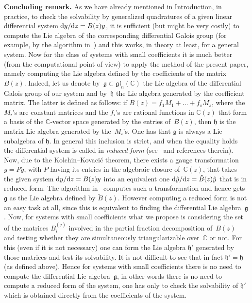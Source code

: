 \documentclass[pdftex]{sigma}
\numberwithin{equation}{section}
\begin{document}
{\bf Concluding remark.} As we have already mentioned in Introduction, in practice, to check the solvability by generalized quadratures of a given linear differential system ${\rm d}y/{\rm d}z =B(z)y$, it is sufficient (but might be very costly) to compute the Lie algebra of the corresponding differential Galois group (for example, by the algorithm in~\cite{BCDW16}) and this works, in theory at least, for a general system. Now for the class of systems with small coefficients it is much better (from the computational point of view) to apply the method of the present paper, namely computing the Lie algebra defined by the coefficients of the matrix~$B(z)$. Indeed, let us denote by~$\mathfrak{g} \subset {\mathfrak{gl}}_n({\mathbb C})$ the Lie algebra of the differential Galois group of our system and by~$\mathfrak{h}$ the Lie algebra generated by the coefficient matrix. The latter is defined as follows: if $B(z) = f_1M_1 + \dots+ f_sM_s$, where the~$M_i$'s are constant matrices and the $f_i$'s are rational functions in ${\mathbb C}(z)$ that form a basis of the $\mathbb C$-vector space generated by the entries of~$B(z)$, then $\mathfrak{h}$ is the matrix Lie algebra generated by the~$M_i$'s. One has that $\mathfrak{g}$ is always a Lie subalgebra of $\mathfrak{h}$. In general this inclusion is strict, and when the equality holds the differential system is called in {\em reduced form} (see~\cite{BCDW16} and references therein). Now, due to the Kolchin--Kovaci\'c theorem, there exists a gauge transformation $y = P \tilde{y}$, with $P$ having its entries in the algebraic closure of~${\mathbb C}(z)$, that takes the given system ${\rm d}y/{\rm d}z = B(z) y$ into an equivalent one ${\rm d}\tilde{y}/{\rm d}z=\tilde{B}(z) \tilde{y}$ that is in reduced form. The algorithm in~\cite{BCDW16} computes such a transformation and hence gets $\mathfrak{g}$ as the Lie algebra defined by $\tilde{B}(z)$. However computing a reduced form is not an easy task at all, since this is equivalent to finding the differential Lie algebra~$\mathfrak{g}$. Now, for systems with small coefficients what we propose is considering the set of the matrices $B_i^{(j)}$ involved in the partial fraction decomposition of~$B(z)$ and testing whether they are
simultaneously triangularizable over~$\mathbb C$ or not. For this (even if it is not necessary) one can form the Lie algebra $\mathfrak{h}'$ generated by those matrices and test its solvability. It is not difficult to see that in fact $\mathfrak{h}' = \mathfrak{h}$ (as defined above). Hence for systems with small coefficients there is no need to compute the differential Lie algebra~$\mathfrak{g}$, in other words there is no need to compute a reduced form of the system, one has only to check the solvability of $\mathfrak{h}'$ which is obtained directly from the coefficients of the system.
\end{document}
